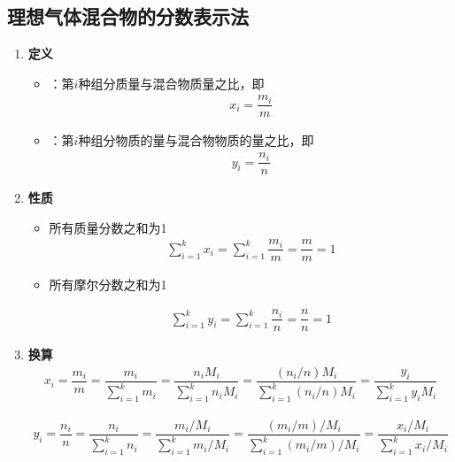 \subsection{理想气体混合物的分数表示法
}
\begin{enumerate}[1.]
	\item \textbf{定义}
	\begin{itemize}
		\item {}：第$i$种组分质量与混合物质量之比，即
		\begin{align}
			x_i = \dfrac{m_i}{m}
		\end{align}
		
		\item {}：第$i$种组分物质的量与混合物物质的量之比，即
		\begin{align}
			y_i = \dfrac{n_i}{n}
		\end{align}
	\end{itemize}
	
	\item \textbf{性质}
	\begin{itemize}
		\item 所有质量分数之和为1
		\begin{align}
			\sum_{i = 1}^{k} x_i =\sum_{i = 1}^{k}  \dfrac{m_i}{m} = \dfrac{m}{m} = 1
		\end{align}
		
		\item 所有摩尔分数之和为1
	
		\begin{align}
			\sum_{i = 1}^{k} y_i =\sum_{i = 1}^{k}  \dfrac{n_i}{n} = \dfrac{n}{n} = 1
		\end{align}
	\end{itemize}
	
	\item \textbf{换算}
	\begin{align}
		x_i = \dfrac{m_i}{m} = \dfrac{m_i}{\displaystyle \sum_{i = 1}^{k}m_i} 
		= \dfrac{n_i M_i}{\displaystyle \sum_{i = 1}^k n_i M_i} = \dfrac{(n_i/n) M_i}{\displaystyle \sum_{i = 1}^k (n_i/n) M_i}
		= \dfrac{y_i}{\sum_{i = 1}^k y_iM_i} 
	\end{align}
	\vspace*{-3em}
	
	\begin{align}
		y_i = \dfrac{n_i}{n} = \dfrac{n_i}{\displaystyle \sum_{i = 1}^{k}n_i} 
		= \dfrac{m_i/M_i}{\displaystyle \sum_{i = 1}^k m_i / M_i} = \dfrac{(m_i/m) / M_i}{\displaystyle \sum_{i = 1}^k (m_i/m) / M_i}
		= \dfrac{x_i / M_i}{\displaystyle \sum_{i = 1}^k x_i / M_i} 
	\end{align}
	
\end{enumerate}

